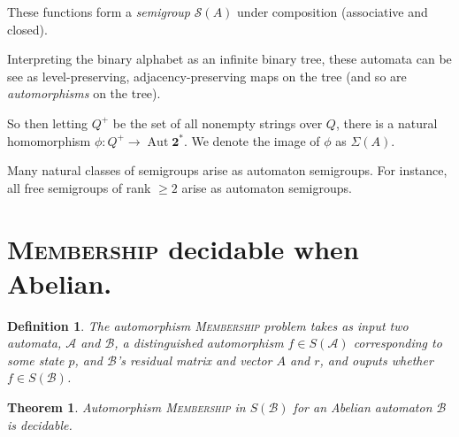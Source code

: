 \documentclass[a0]{a0poster}
\newcommand{\decprob}[1]{\textsc{#1}}
\newcommand{\Z}{\mathbb{Z}}
\newcommand{\A}{\mathcal{A}}
\newcommand{\B}{\mathcal{B}}
\newcommand{\defn}[1]{{\color{NavyBlue}\emph{#1}}}
\newcommand{\defndecprob}[1]{{\color{NavyBlue}\textsc{#1}}}
\theoremstyle{pleasant}
\newtheorem{theorem}{Theorem}
\newtheorem{definition}{Definition}
\newenvironment{proofsketch}{\paragraph{\large \normalfont \textit{Proof Sketch:}}}{\hfill$\square$}
\newcommand{\0}{\underline{0}}
\newcommand{\1}{\underline{1}}
\newcommand{\2}{\underline{2}}
\renewcommand{\S}{\mathcal{S}}
\begin{document}
\begin{multicols}{3}
These functions form a \defn{semigroup} $\S(A)$ under composition
(associative and closed).

Interpreting the binary alphabet as an infinite binary tree, these
automata can be see as level-preserving, adjacency-preserving maps on
the tree (and so are \defn{automorphisms} on the tree).


So then letting $Q^+$ be the set of all nonempty strings over $Q$,
there is a natural homomorphism
$\phi : Q^+ \rightarrow \operatorname{Aut}\textbf{2}^*$. We denote the
image of $\phi$ as $\Sigma(A)$.


Many natural classes of semigroups arise as automaton semigroups. For
instance, all free semigroups of rank $\geq 2$ arise as automaton
semigroups.

\section*{\decprob{Membership} decidable when Abelian.}

\begin{definition}
  The automorphism \defndecprob{Membership} problem takes as input two
  automata, $\A$ and $\B$, a distinguished automorphism $f \in S(\A)$
  corresponding to some state $p$, and $\B$'s residual matrix and
  vector $A$ and $r$, and ouputs whether $f \in S(\B)$.
\end{definition}

\begin{theorem}
  Automorphism \decprob{Membership} in $S(\B)$ for an Abelian
  automaton $\B$ is decidable.
\end{theorem}



\end{multicols}
\end{document}
